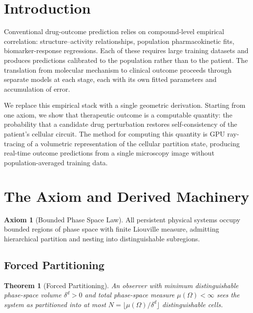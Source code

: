\documentclass[twocolumn,10pt,a4paper]{article}
\newtheorem{theorem}{Theorem}[section]
\theoremstyle{definition}
\newtheorem{axiom}{Axiom}
\theoremstyle{remark}
\begin{document}
\section{Introduction}

Conventional drug-outcome prediction relies on compound-level empirical correlation: structure--activity relationships, population pharmacokinetic fits, biomarker-response regressions. Each of these requires large training datasets and produces predictions calibrated to the population rather than to the patient. The translation from molecular mechanism to clinical outcome proceeds through separate models at each stage, each with its own fitted parameters and accumulation of error.

We replace this empirical stack with a single geometric derivation. Starting from one axiom, we show that therapeutic outcome is a computable quantity: the probability that a candidate drug perturbation restores self-consistency of the patient's cellular circuit. The method for computing this quantity is GPU ray-tracing of a volumetric representation of the cellular partition state, producing real-time outcome predictions from a single microscopy image without population-averaged training data.

\section{The Axiom and Derived Machinery}

\begin{axiom}[Bounded Phase Space Law]
\label{ax:bps}
All persistent physical systems occupy bounded regions of phase space with finite Liouville measure, admitting hierarchical partition and nesting into distinguishable subregions.
\end{axiom}

\subsection{Forced Partitioning}

\begin{theorem}[Forced Partitioning]
An observer with minimum distinguishable phase-space volume $\delta^d > 0$ and total phase-space measure $\mu(\Omega) < \infty$ sees the system as partitioned into at most $N = \lfloor\mu(\Omega)/\delta^d\rfloor$ distinguishable cells.
\end{theorem}
\end{document}

